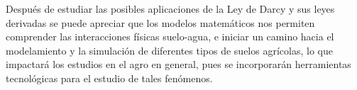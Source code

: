 Después de estudiar las posibles aplicaciones de la Ley de Darcy y sus leyes derivadas se puede apreciar que los modelos matemáticos nos permiten comprender las interacciones físicas suelo-agua, e iniciar un camino hacia el modelamiento y la simulación de diferentes tipos de suelos agrícolas, lo que impactará los estudios en el agro en general, pues se incorporarán herramientas tecnológicas para el estudio de tales fenómenos.






